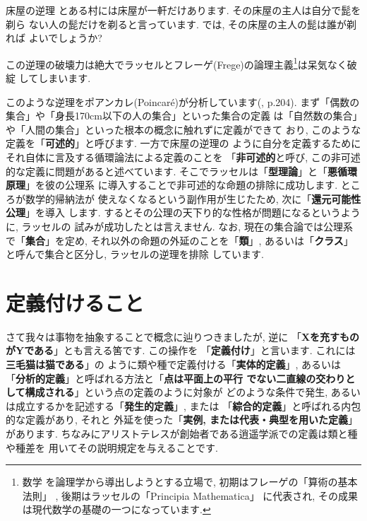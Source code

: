 \documentclass[b5j,8pt,twocolumn]{ltjsarticle}
\begin{document}
\begin{itembox}[c]{{床屋の逆理}}
\quad とある村には床屋が一軒だけあります. その床屋の主人は自分で髭を剃ら
ない人の髭だけを剃ると言っています. では, その床屋の主人の髭は誰が剃れば
よいでしょうか?
\end{itembox}


この逆理の破壊力は絶大でラッセルとフレーゲ(Frege)の論理主義\footnote{数学
を論理学から導出しようとする立場で, 初期はフレーゲの「算術の基本法則」
\cite{フレーゲ}, 後期はラッセルの「Principia Mathematica」\cite{Russell}
に代表され, その成果は現代数学の基礎の一つになっています.}は呆気なく破綻
してしまいます.
\newline


このような逆理をポアンカレ(Poincar\'e)が分析しています(\cite{ポアンカレ},
p.204). まず「偶数の集合」や「身長170cm以下の人の集合」といった集合の定義
は「自然数の集合」や「人間の集合」といった根本の概念に触れずに定義ができて
おり, このような定義を「\textbf{可述的}」と呼びます. 一方で床屋の逆理の
ように自分を定義するためにそれ自体に言及する循環論法による定義のことを
「\textbf{非可述的}と呼び, この非可述的な定義に問題があると述べています.
 そこでラッセルは「\textbf{型理論}」と「\textbf{悪循環原理}」を彼の公理系
に導入することで非可述的な命題の排除に成功します. ところが数学的帰納法が
使えなくなるという副作用が生じたため, 次に「\textbf{還元可能性公理}」を導入
します. するとその公理の天下り的な性格が問題になるというように, ラッセルの
試みが成功したとは言えません\cite{Russell}. なお, 現在の集合論では公理系
で「\textbf{集合}」を定め, それ以外の命題の外延のことを「\textbf{類}」,
 あるいは「\textbf{クラス}」と呼んで集合と区分し, ラッセルの逆理を排除
しています.

\section{定義付けること}

さて我々は事物を抽象することで概念に辿りつきましたが, 逆に
「\textbf{Xを充すものがYである}」とも言える筈です. この操作を
「\textbf{定義付け}」と言います. これには\textbf{三毛猫は猫である}」の
ように類や種で定義付ける「\textbf{実体的定義}」, あるいは
「\textbf{分析的定義}」と呼ばれる方法と「\textbf{点は平面上の平行
でない二直線の交わりとして構成される}」という点の定義のように対象が
どのような条件で発生, あるいは成立するかを記述する「\textbf{発生的定義}」,
 または 「\textbf{綜合的定義}」と呼ばれる内包的な定義があり, それと
外延を使った「\textbf{実例, または代表・典型を用いた定義}」があります.
 ちなみにアリストテレスが創始者である逍遥学派での定義は類と種や種差を
用いてその説明規定を与えることです.
\end{document}
